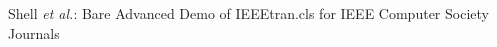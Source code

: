 \documentclass[10pt,journal,compsoc]{IEEEtran}
\begin{document}
% 
%



%
{Shell \MakeLowercase{\textit{et al.}}: Bare Advanced Demo of IEEEtran.cls for IEEE Computer Society Journals}
% 



\end{document}
